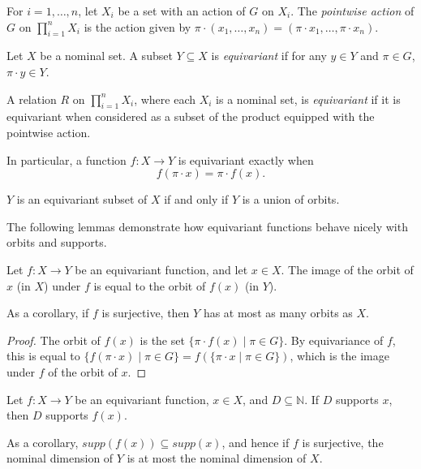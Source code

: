 \documentclass[runningheads]{llncs}
\newcommand{\bb}{\mathbb}
\begin{document}
For $i=1, \ldots, n$, let $X_i$ be a set with an action of $G$ on $X_i$. 
The \emph{pointwise action} of $G$ on $\prod_{i=1}^n X_i$ is the action given by $\pi \cdot (x_1, \ldots, x_n) = (\pi \cdot x_1, \ldots, \pi \cdot x_n)$.

\begin{definition}[Equivariance]
    Let $X$ be a nominal set.
    A subset $Y \subseteq X$ is \emph{equivariant} if for any $y \in Y$ and $\pi \in G$, $\pi \cdot y \in Y$. 
    
    A relation $R$ on $\prod_{i=1}^n X_i$, where each $X_i$ is a nominal set, is \emph{equivariant} if it is equivariant when considered as a subset of the product equipped with the pointwise action. 
    
    In particular, a function $f : X \to Y$ is equivariant exactly when
    \[
    f(\pi \cdot x) = \pi \cdot f(x).
    \]
\end{definition}

\begin{remark}
    $Y$ is an equivariant subset of $X$ if and only if $Y$ is a union of orbits.
\end{remark}

The following lemmas demonstrate how equivariant functions behave nicely with orbits and supports.

\begin{lemma} \label{lem:orbit of image under equivariant function}
    Let $f : X \to Y$ be an equivariant function, and let $x \in X$. 
    The image of the orbit of $x$ (in $X$) under $f$ is equal to the orbit of $f(x)$ (in $Y$).

    As a corollary, if $f$ is surjective, then $Y$ has at most as many orbits as $X$.
\end{lemma}

\begin{proof}
    The orbit of $f(x)$ is the set $\{\pi \cdot f(x) \mid \pi \in G\}$.
    By equivariance of $f$, this is equal to $\{f(\pi \cdot x) \mid \pi \in G\} = f(\{\pi \cdot x \mid \pi \in G\})$, which is the image under $f$ of the orbit of $x$.
\end{proof}

\begin{lemma} \label{lem:supports preserved under equivariant functions}
    Let $f : X \to Y$ be an equivariant function, $x \in X$, and $D \subseteq \bb N$.
    If $D$ supports $x$, then $D$ supports $f(x)$. 

    As a corollary, $supp(f(x)) \subseteq supp(x)$, and hence if $f$ is surjective, the nominal dimension of $Y$ is at most the nominal dimension of $X$.
\end{lemma}
\end{document}
